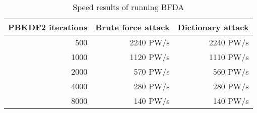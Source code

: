 \begin{table}[!h]
    \centering
    \caption{Speed results of running \acs{BFDA}}
    \label{tab:res_bf}
    \begin{tabular}{| r | r | r |}
	\hline
	\ac{PBKDF2} iterations          &Brute force attack	    &Dictionary attack	\\
	\hline
	500                             &2240 PW/s                &2240 PW/s	\\
	\hline
	1000                            &1120 PW/s                &1110 PW/s	\\
	\hline
	2000                            &570 PW/s                 &560 PW/s	\\
	\hline
	4000                            &280 PW/s                 &280 PW/s	\\
	\hline
    8000                            &140 PW/s                 &140 PW/s \\
    \hline
    \end{tabular}
\end{table}
